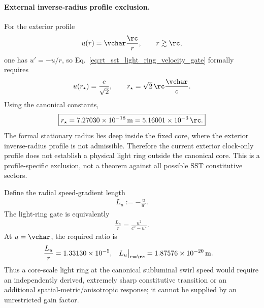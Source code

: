        \paragraph{External inverse-radius profile exclusion.}
        For the exterior profile
        \begin{align}
            u(r)
            =
            \vchar\frac{\rc}{r},
            \qquad r\gtrsim\rc,
            \label{eq:rt_sst_external_inverse_radius_profile}
        \end{align}
        one has \(u'=-u/r\), so
        Eq.~\eqref{eq:rt_sst_light_ring_velocity_gate} formally requires
        \begin{align}
            u(r_\star)=\frac{c}{\sqrt{2}},
            \qquad
            r_\star
            =
            \sqrt{2}\,\rc\frac{\vchar}{c}.
            \label{eq:rt_sst_formal_light_ring_radius}
        \end{align}
        Using the canonical constants,
        \begin{align}
            \boxed{
            r_\star
            =
            7.27030\times10^{-18}\,\mathrm{m}
            =
            5.16001\times10^{-3}\,\rc.
            }
            \label{eq:rt_sst_inverse_radius_light_ring_exclusion}
        \end{align}
        The formal stationary radius lies deep inside the fixed core, where the exterior
        inverse-radius profile is not admissible.  Therefore the current exterior
        clock-only profile does not establish a physical light ring outside the
        canonical core.  This is a profile-specific exclusion, not a theorem against all
        possible SST constitutive sectors.

        Define the radial speed-gradient length
        \begin{align}
            L_u:=-\frac{u}{u'}.
        \end{align}
        The light-ring gate is equivalently
        \begin{align}
            \boxed{
            \frac{L_u}{r}
            =
            \frac{u^2}{c^2-u^2}.
            }
            \label{eq:rt_sst_light_ring_gradient_scale}
        \end{align}
        At \(u=\vchar\), the required ratio is
        \begin{align}
            \frac{L_u}{r}
            &=
            1.33130\times10^{-5},
            &
            L_u\big|_{r=\rc}
            &=
            1.87576\times10^{-20}\,\mathrm{m}.
        \end{align}
        Thus a core-scale light ring at the canonical subluminal swirl speed would
        require an independently derived, extremely sharp constitutive transition or an
        additional spatial-metric/anisotropic response; it cannot be supplied by an
        unrestricted gain factor.

